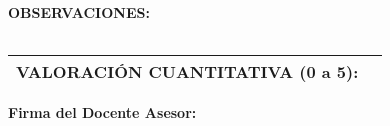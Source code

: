 \documentclass[a4paper,12pt]{article}
\begin{document}
\vspace{0.5cm}
\noindent
\textbf{OBSERVACIONES:} \\
\begin{tabularx}{\textwidth}{|X|}
    \hline
    \vspace{4cm} \\ %
    \hline
\end{tabularx}

\vspace{0.5cm}
\begin{tabularx}{\textwidth}{@{}p{5cm}X@{}}
    \toprule
    \textbf{VALORACIÓN CUANTITATIVA (0 a 5):} & \hrulefill \\
    \bottomrule
\end{tabularx}

\vspace{0.5cm}
\begin{center}
    \textbf{Firma del Docente Asesor:} \hrulefill
\end{center}
\end{document}
